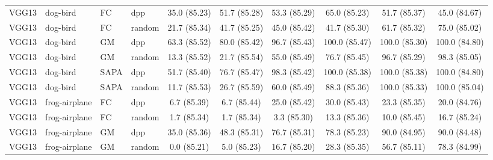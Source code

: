 \begin{table}[h]
{\begin{tabular}{llllcccccc}
VGG13 & dog-bird & FC & dpp
& 35.0 \small{(85.23)}
& 51.7 \small{(85.28)}
& 53.3 \small{(85.29)}
& 65.0 \small{(85.23)}
& 51.7 \small{(85.37)}
& 45.0 \small{(84.67)} \\


VGG13 & dog-bird & FC & random
& 21.7 \small{(85.34)}
& 41.7 \small{(85.25)}
& 45.0 \small{(85.42)}
& 41.7 \small{(85.30)}
& 61.7 \small{(85.32)}
& 75.0 \small{(85.02)} \\
\addlinespace

VGG13 & dog-bird & GM & dpp
& 63.3 \small{(85.52)}
& 80.0 \small{(85.42)}
& 96.7 \small{(85.43)}
& 100.0 \small{(85.47)}
& 100.0 \small{(85.30)}
& 100.0 \small{(84.80)} \\



VGG13 & dog-bird & GM & random
& 13.3 \small{(85.52)}
& 21.7 \small{(85.54)}
& 55.0 \small{(85.49)}
& 76.7 \small{(85.45)}
& 96.7 \small{(85.29)}
& 98.3 \small{(85.05)} \\ [1em]

VGG13 & dog-bird & SAPA & dpp
& 51.7 \small{(85.40)}
& 76.7 \small{(85.47)}
& 98.3 \small{(85.42)}
& 100.0 \small{(85.38)}
& 100.0 \small{(85.38)}
& 100.0 \small{(84.80)}\\



VGG13 & dog-bird & SAPA & random
& 11.7 \small{(85.53)}
& 26.7 \small{(85.59)}
& 60.0 \small{(85.49)}
& 88.3 \small{(85.36)}
& 100.0 \small{(85.33)}
& 100.0 \small{(85.04)} \\ [1em]




VGG13 & frog-airplane & FC & dpp
& 6.7 \small{(85.39)}
& 6.7 \small{(85.44)}
& 25.0 \small{(85.42)}
& 30.0 \small{(85.43)}
& 23.3 \small{(85.35)}
& 20.0 \small{(84.76)} \\


VGG13 & frog-airplane & FC & random
& 1.7 \small{(85.34)}
& 1.7 \small{(85.34)}
& 3.3 \small{(85.30)}
& 13.3 \small{(85.36)}
& 10.0 \small{(85.45)}
& 16.7 \small{(85.24)} \\ [1em]


VGG13 & frog-airplane & GM & dpp
& 35.0 \small{(85.36)}
& 48.3 \small{(85.31)}
& 76.7 \small{(85.31)}
& 78.3 \small{(85.23)}
& 90.0 \small{(84.95)}
& 90.0 \small{(84.48)} \\


VGG13 & frog-airplane & GM & random
& 0.0 \small{(85.21)}
& 5.0 \small{(85.23)}
& 16.7 \small{(85.20)}
& 28.3 \small{(85.35)}
& 56.7 \small{(85.11)}
& 78.3 \small{(84.99)} \\ [1em]


\end{tabular}}
\end{table}
